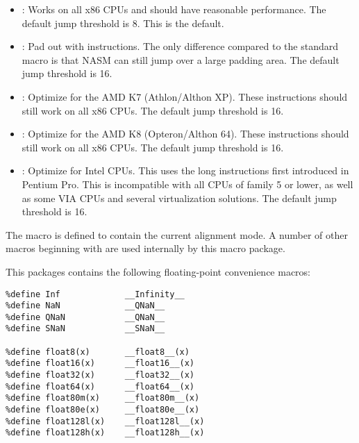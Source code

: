 \begin{itemize}
    \item{: Works on all x86 CPUs and should have
    reasonable performance. The default jump threshold is 8.
    This is the default.}

    \item{: Pad out with  instructions. The only
    difference compared to the standard  macro is that NASM
    can still jump over a large padding area. The default jump
    threshold is 16.}

    \item{: Optimize for the AMD K7 (Athlon/Althon XP).
    These instructions should still work on all x86 CPUs. The default
    jump threshold is 16.}

    \item{: Optimize for the AMD K8 (Opteron/Althon 64).
    These instructions should still work on all x86 CPUs. The default
    jump threshold is 16.}

    \item{: Optimize for Intel CPUs. This uses the long
     instructions first introduced in Pentium Pro. This
    is incompatible with all CPUs of family 5 or lower, as well as
    some VIA CPUs and several virtualization solutions. The default
    jump threshold is 16.}
\end{itemize}

The macro  is defined to contain the
current alignment mode. A number of other macros beginning with
 are used internally by this macro package.


This packages contains the following floating-point convenience macros:

\begin{lstlisting}
%define Inf             __Infinity__
%define NaN             __QNaN__
%define QNaN            __QNaN__
%define SNaN            __SNaN__

%define float8(x)       __float8__(x)
%define float16(x)      __float16__(x)
%define float32(x)      __float32__(x)
%define float64(x)      __float64__(x)
%define float80m(x)     __float80m__(x)
%define float80e(x)     __float80e__(x)
%define float128l(x)    __float128l__(x)
%define float128h(x)    __float128h__(x)
\end{lstlisting}


